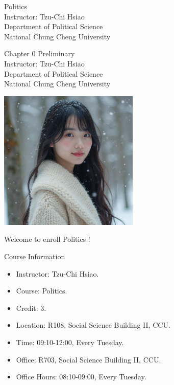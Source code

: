 \documentclass{beamer}
\title{}
\author{}
\date{}
\begin{document}
\begin{frame}
\begin{center}
\Large{Politics} \\
\vspace{3em}
\normalsize{Instructor: Tzu-Chi Hsiao} \\
\vspace{3em}
\small{Department of Political Science} \\
\vspace{1em}
\small{National Chung Cheng University}
\end{center}
\end{frame}
\begin{frame}
\begin{center}
\Large{Chapter 0 Preliminary} \\
\vspace{3em}
\normalsize{Instructor: Tzu-Chi Hsiao} \\
\vspace{3em}
\small{Department of Political Science} \\
\vspace{1em}
\small{National Chung Cheng University} \\
\end{center}
\end{frame}
\begin{frame}{}
\begin{center}
\includegraphics[width=0.5\textwidth]{instructor.png}
\end{center}
\vspace{1em}
\begin{center}
\Large{Welcome to enroll Politics !} \\
\end{center}
\end{frame}
\begin{frame}{Course Information}
\begin{itemize}
\item Instructor: Tzu-Chi Hsiao.
\item Course: Politics.
\item Credit: 3.
\item Location: R108, Social Science Building II, CCU.
\item Time: 09:10-12:00, Every Tuesday.
\item Office: R703, Social Science Building II, CCU.
\item Office Hours: 08:10-09:00, Every Tuesday.
\end{itemize}
\end{frame}
\end{document}
